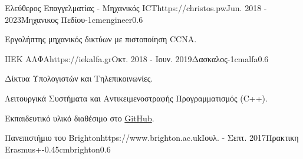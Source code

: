 \documentclass{mycv}
\begin{document}
	\vspace*{0.5cm}

	\begin{EntryDatedLogo}{Ελεύθερος Επαγγελματίας - Μηχανικός ICT}{https://christos.pw}{Jun. 2018 - 2023}{Μηχανικος Πεδίου}{-1cm}{engineer}{0.6}
		\begin{Itemize}
			\item Εργολήπτης μηχανικός δικτύων με πιστοποίηση CCNA.
		\end{Itemize}
	\end{EntryDatedLogo}

	\vspace*{0.5cm}	

	
	\vspace*{0.5cm}
	
	\begin{EntryDatedLogo}{ΙΙΕΚ ΑΛΦΑ}{https://iekalfa.gr}{Οκτ. 2018 - Ιουν. 2019}{Δασκαλος}{-1cm}{alfa}{0.6}
		\begin{Itemize}
			\item Δίκτυα Υπολογιστών και Τηλεπικοινωνίες.
			\item Λειτουργικά Συστήματα και Αντικειμενοστραφής Προγραμματισμός (C++).
			\item Εκπαιδευτικό υλικό διαθέσιμο στο \href{https://github.com/cdalamagkas/cs-lectures-gr}{GitHub}.
		\end{Itemize}
	\end{EntryDatedLogo}

	\vspace*{0.5cm}
		
	\begin{EntryDatedLogo}{Πανεπιστήμιο του Brighton}{https://www.brighton.ac.uk}{Ιουλ. - Σεπτ. 2017}{Πρακτικη Erasmus+}{-0.45cm}{brighton}{0.6}
	\end{EntryDatedLogo}
\end{document}
